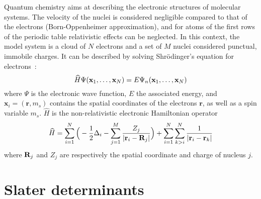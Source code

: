 \documentclass[./thesis.tex]{subfiles}
\begin{document}
Quantum chemistry aims at describing the electronic structures of molecular
systems.  The velocity of the nuclei is considered negligible compared to that
of the electrons (Born-Oppenheimer approximation), and for atoms of the first
rows of the periodic table relativistic effects can be neglected.  In this
context, the model system is a cloud of $N$ electrons and a set of $M$ nuclei
considered punctual, immobile charges. It can be described by solving
Shrödinger's equation for electrons~:
\begin{equation}
 \widehat{H} \Psi({\bf x}_1,\dots,{\bf x}_N) = E \Psi_n({\bf x}_1,\dots,{\bf x}_N)
\end{equation}
where $\Psi$ is the electronic wave function, $E$ the associated energy, and $\mathbf{x}_i = (\textbf{r},m_s)$
contains the spatial coordinates of the electrons $\textbf{r}$, as well as a spin variable $m_s$.
$\widehat H$ is the non-relativistic electronic Hamiltonian operator
\begin{equation}
\widehat{H} = \sum_{i=1}^{N} \Big ( -\frac{1}{2} \Delta_i - \sum_{j=1}^M \frac{Z_j}{|{\bf r}_i - {\bf R}_j|} \Big ) + \sum_{i=1}^{N} \sum_{k>i}^{N} \frac{1}{|{\bf r}_i - {\bf r}_k|}
\end{equation}
where ${\bf R}_j$ and $Z_j$ are respectively the spatial coordinate and charge of nucleus $j$.

\section{Slater determinants}
\end{document}
